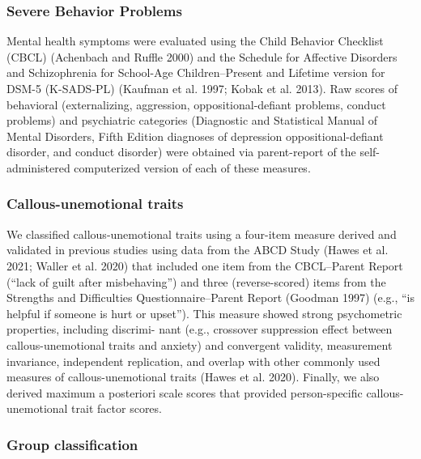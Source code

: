 \documentclass{article}
\begin{document}
\hypertarget{severe-behavior-problems}{%
\subsubsection{Severe Behavior
Problems}\label{severe-behavior-problems}}

Mental health symptoms were evaluated using the Child Behavior Checklist
(CBCL) (Achenbach and Ruffle 2000) and the Schedule for Affective
Disorders and Schizophrenia for School-Age Children--Present and
Lifetime version for DSM-5 (K-SADS-PL) (Kaufman et al. 1997; Kobak et
al. 2013). Raw scores of behavioral (externalizing, aggression,
oppositional-defiant problems, conduct problems) and psychiatric
categories (Diagnostic and Statistical Manual of Mental Disorders, Fifth
Edition diagnoses of depression oppositional-defiant disorder, and
conduct disorder) were obtained via parent-report of the
self-administered computerized version of each of these measures.

\hypertarget{callous-unemotional-traits}{%
\subsubsection{Callous-unemotional
traits}\label{callous-unemotional-traits}}

We classified callous-unemotional traits using a four-item measure
derived and validated in previous studies using data from the ABCD Study
(Hawes et al. 2021; Waller et al. 2020) that included one item from the
CBCL--Parent Report (``lack of guilt after misbehaving'') and three
(reverse-scored) items from the Strengths and Difficulties
Questionnaire--Parent Report (Goodman 1997) (e.g., ``is helpful if
someone is hurt or upset''). This measure showed strong psychometric
properties, including discrimi- nant (e.g., crossover suppression effect
between callous-unemotional traits and anxiety) and convergent validity,
measurement invariance, independent replication, and overlap with other
commonly used measures of callous-unemotional traits (Hawes et al.
2020). Finally, we also derived maximum a posteriori scale scores that
provided person-specific callous-unemotional trait factor scores.

\hypertarget{group-classification}{%
\subsubsection{Group classification}\label{group-classification}}
\end{document}
